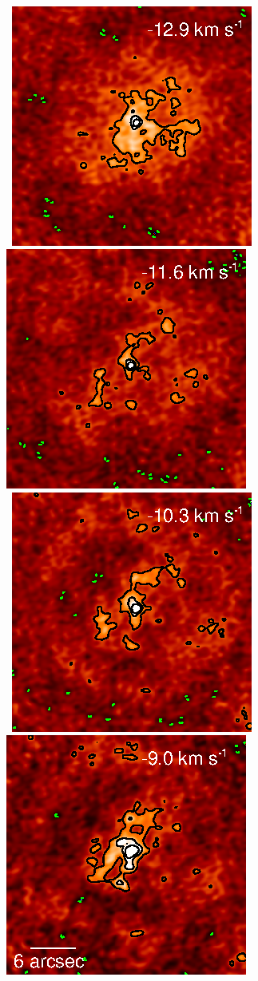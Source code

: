 \documentclass[iop]{emulateapj}
\begin{document}
\begin{figure}[hbt!]
{          }
\\
\mbox{
          \includegraphics[]{f7.ps}
          \includegraphics[]{f8.ps}
         }
\\
\mbox{
          \includegraphics[]{f9.ps}
          \includegraphics[]{f10.ps}
}
\end{figure}
\end{document}
